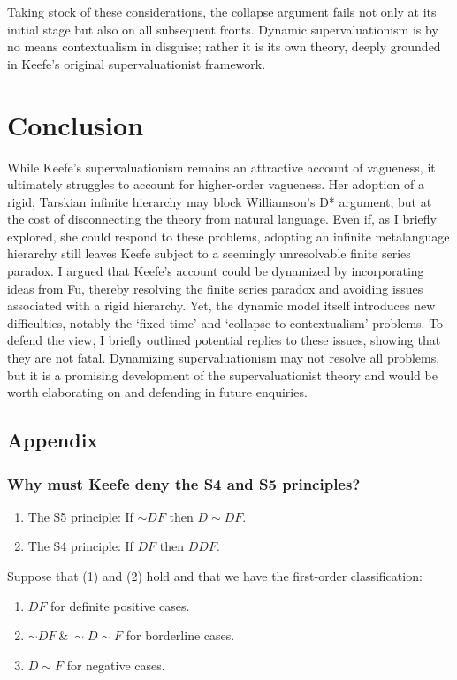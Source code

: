 Taking stock of these considerations, the collapse argument fails not
only at its initial stage but also on all subsequent fronts. Dynamic
supervaluationism is by no means contextualism in disguise; rather it is
its own theory, deeply grounded in Keefe's original supervaluationist
framework.

\section{Conclusion}

While Keefe's supervaluationism remains an attractive account of
vagueness, it ultimately struggles to account for higher-order
vagueness. Her adoption of a rigid, Tarskian infinite hierarchy may
block Williamson's D* argument, but at the cost of disconnecting the
theory from natural language. Even if, as I briefly explored, she could
respond to these problems, adopting an infinite metalanguage hierarchy
still leaves Keefe subject to a seemingly unresolvable finite series
paradox. I argued that Keefe's account could be dynamized by
incorporating ideas from Fu, thereby resolving the finite series paradox
and avoiding issues associated with a rigid hierarchy. Yet, the dynamic
model itself introduces new difficulties, notably the `fixed time' and
`collapse to contextualism' problems. To defend the view, I briefly
outlined potential replies to these issues, showing that they are not
fatal. Dynamizing supervaluationism may not resolve all problems, but it
is a promising development of the supervaluationist theory and would be
worth elaborating on and defending in future enquiries.

\subsection*{Appendix}

\subsubsection*{Why must Keefe deny the S4 and S5 principles?}

\begin{enumerate}
\def\labelenumi{(\arabic{enumi})}
\item The S5 principle: If ${\sim}DF$ then $D{\sim}DF$.
\item The S4 principle: If $DF$ then $DDF$. 
\end{enumerate}
Suppose that (1) and (2) hold and that we have the first-order
classification:
\begin{enumerate}
  \def\labelenumi{(\roman{enumi})}
\item{$DF$ for definite positive cases.}
\item{${\sim}DF \ \& \ {\sim}D{\sim}F$ for borderline cases.}
  \item{$D{\sim}F$ for negative cases.}
  \end{enumerate}

